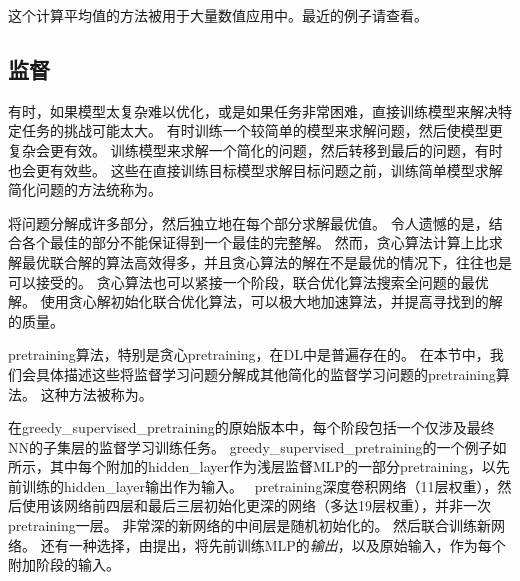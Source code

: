 这个计算平均值的方法被用于大量数值应用中。最近的例子请查看\cite{Szegedy-et-al-2015}。

\subsection{监督}
\label{sec:supervised_pretraining}
有时，如果模型太复杂难以优化，或是如果任务非常困难，直接训练模型来解决特定任务的挑战可能太大。
有时训练一个较简单的模型来求解问题，然后使模型更复杂会更有效。
训练模型来求解一个简化的问题，然后转移到最后的问题，有时也会更有效些。
这些在直接训练目标模型求解目标问题之前，训练简单模型求解简化问题的方法统称为。


将问题分解成许多部分，然后独立地在每个部分求解最优值。
令人遗憾的是，结合各个最佳的部分不能保证得到一个最佳的完整解。
然而，贪心算法计算上比求解最优联合解的算法高效得多，并且贪心算法的解在不是最优的情况下，往往也是可以接受的。
贪心算法也可以紧接一个阶段，联合优化算法搜索全问题的最优解。
使用贪心解初始化联合优化算法，可以极大地加速算法，并提高寻找到的解的质量。

\gls{pretraining}算法，特别是贪心\gls{pretraining}，在\gls{DL}中是普遍存在的。
在本节中，我们会具体描述这些将监督学习问题分解成其他简化的监督学习问题的\gls{pretraining}算法。
这种方法被称为。


在\gls{greedy_supervised_pretraining}的原始版本\citep{Bengio-nips-2006-short}中，每个阶段包括一个仅涉及最终\gls{NN}的子集层的监督学习训练任务。
\gls{greedy_supervised_pretraining}的一个例子如所示，其中每个附加的\gls{hidden_layer}作为浅层监督\gls{MLP}的一部分\gls{pretraining}，以先前训练的\gls{hidden_layer}输出作为输入。
\cite{Simonyan2015}~\gls{pretraining}深度卷积网络（11层权重），然后使用该网络前四层和最后三层初始化更深的网络（多达19层权重），并非一次\gls{pretraining}一层。
非常深的新网络的中间层是随机初始化的。
然后联合训练新网络。
还有一种选择，由\cite{Yu+al-2010}提出，将先前训练\gls{MLP}的\emph{输出}，以及原始输入，作为每个附加阶段的输入。

